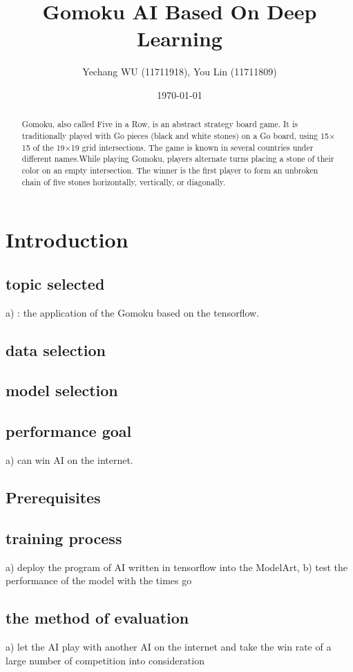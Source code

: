 \documentclass[lang=en,12pt]{elegantpaper}
\title{Gomoku AI Based On Deep Learning}
\author{Yechang WU (11711918), You Lin (11711809)}
\institute{Southern University of Science and Technology}
\date{\today}
\begin{document}
\maketitle

\begin{abstract}
  Gomoku, also called Five in a Row, is an abstract strategy board game.
  It is traditionally played with Go pieces (black and white stones) on a Go board, using 15$\times$15 of the 19$\times$19 grid intersections.
  The game is known in several countries under different names.While playing Gomoku, players alternate turns placing a stone of their color on an empty intersection. The winner is the first player to form an unbroken chain of five stones horizontally, vertically, or diagonally.

\end{abstract}

\section{Introduction}
\subsection{topic selected}
a)	 : the application of the Gomoku based on the tensorflow.
\subsection{data selection}
\subsection{model selection}
\subsection{performance goal}
a)	can win AI on the internet.
\subsection{Prerequisites}
\subsection{training process}
a)	deploy the program of AI written in tensorflow into the ModelArt,
b)	test the performance of the model with the times go
\subsection{the method of evaluation}
a)	let the AI play with another AI on the internet and take the win rate of a large number of competition into consideration

% 
\end{document}
